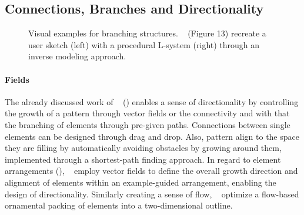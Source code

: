 \subsection{Connections, Branches and Directionality}
\label{subsec:analysis_connections_branches_and_directionality}

  

\begin{figure}[H]
    \centering
    \caption{\label{fig:guo_2020_ipm} Visual examples for branching structures. \citeauthor*{guo_2020_ipm}~\cite{guo_2020_ipm} (Figure 13) recreate a user sketch (left) with a procedural L-system (right) through an inverse modeling approach.\color{orange}{ Status rights: ACM request updated.}}
\end{figure}

\paragraph*{Fields}
The already discussed work of \citeauthor*{gieseke_2017_ooo}~\cite{gieseke_2017_ooo} () enables a sense of directionality by controlling the growth of a pattern through vector fields or the connectivity and with that the branching of elements through pre-given paths. Connections between single elements can be designed through drag and drop. Also, pattern align to the space they are filling by automatically avoiding obstacles by growing around them, implemented through a shortest-path finding approach. In regard to element arrangements (), \citeauthor*{ijiri_2008_aeb}~\cite{ijiri_2008_aeb} employ vector fields to define the overall growth direction and alignment of elements within an example-guided arrangement, enabling the design of directionality. Similarly creating a sense of flow, \citeauthor*{saputra_2017_ffo}~\cite{saputra_2017_ffo} optimize a flow-based ornamental packing of elements into a two-dimensional outline. 

